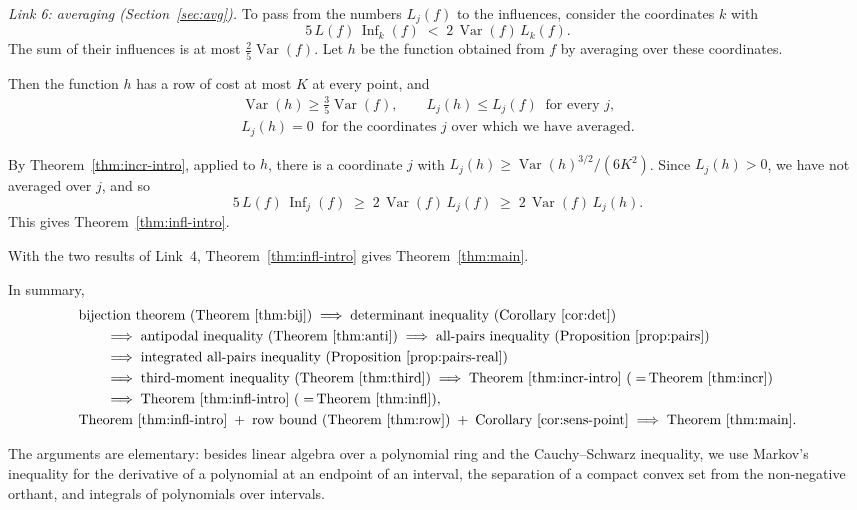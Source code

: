 \documentclass[11pt,reqno]{amsart}
\theoremstyle{definition}
\theoremstyle{remark}
\numberwithin{equation}{section}
\theoremstyle{named}
\theoremstyle{plain}
\newcommand{\Var}{\operatorname{Var}}
\newcommand{\Inf}{\operatorname{Inf}}
\begin{document}
\medskip\noindent\emph{Link 6: averaging \textup{(Section~\ref{sec:avg})}.}
To pass from the numbers $L_j(f)$ to the influences, consider the coordinates $k$ with
\[
   5\,L(f)\,\Inf_k(f)\;<\;2\,\Var(f)\,L_k(f).
\]
The sum of their influences is at most $\frac25\Var(f)$. Let $h$
be the function obtained from $f$ by averaging over these coordinates.

Then the function $h$ has a row of cost at most $K$ at every point, and
\begin{gather*}
   \Var(h)\ge\tfrac35\Var(f),\qquad L_j(h)\le L_j(f)\ \text{ for every }j,\\
   L_j(h)=0\ \text{ for the coordinates $j$ over which we have averaged.}
\end{gather*}

By Theorem~\ref{thm:incr-intro}, applied to $h$, there is a coordinate $j$ with
$L_j(h)\ge\Var(h)^{3/2}/(6K^{2})$. Since $L_j(h)>0$, we have not averaged over $j$, and so
\[
   5\,L(f)\,\Inf_j(f)\;\ge\;2\,\Var(f)\,L_j(f)\;\ge\;2\,\Var(f)\,L_j(h).
\]
This gives Theorem~\ref{thm:infl-intro}.

With the two results of Link~4, Theorem~\ref{thm:infl-intro} gives Theorem~\ref{thm:main}.

\smallskip
In summary,
\begin{align*}
&\text{bijection theorem (Theorem~\ref{thm:bij})}\;\Longrightarrow\;
\text{determinant inequality (Corollary~\ref{cor:det})}\\
&\qquad\Longrightarrow\;\text{antipodal inequality (Theorem~\ref{thm:anti})}\;\Longrightarrow\;
\text{all-pairs inequality (Proposition~\ref{prop:pairs})}\\
&\qquad\Longrightarrow\;\text{integrated all-pairs inequality (Proposition~\ref{prop:pairs-real})}\\
&\qquad\Longrightarrow\;\text{third-moment inequality (Theorem~\ref{thm:third})}\;\Longrightarrow\;
\text{Theorem~\ref{thm:incr-intro} (${}=\,$Theorem~\ref{thm:incr})}\\
&\qquad\Longrightarrow\;\text{Theorem~\ref{thm:infl-intro} (${}=\,$Theorem~\ref{thm:infl})},\\
&\text{Theorem~\ref{thm:infl-intro}}\;+\;\text{row bound (Theorem~\ref{thm:row})}\;+\;
\text{Corollary~\ref{cor:sens-point}}\;\Longrightarrow\;\text{Theorem~\ref{thm:main}}.
\end{align*}

The arguments are elementary: besides linear algebra over a polynomial ring and the Cauchy--Schwarz
inequality, we use Markov's inequality for the derivative of a polynomial at an endpoint of an
interval, the separation of a compact convex set from the non-negative orthant, and integrals of
polynomials over intervals.
\end{document}

